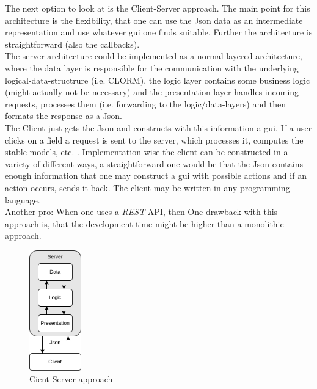 \documentclass[12pt,a4paper]{article}
\newcommand{\<}[1]{\guilsinglleft}
\renewcommand{\>}[1]{\guilsinglright}
\begin{document}
\noindent The next option to look at is the Client-Server approach. The main point for this architecture is the flexibility, that one can use the Json data as an intermediate representation and use whatever gui one finds suitable. Further the architecture is straightforward (also the callbacks).\\
The server architecture could be implemented as a normal layered-architecture, where the data layer is responsible for the communication with the underlying logical-data-structrure (i.e. CLORM), the logic layer contains some business logic (might actually not be necessary) and the presentation layer handles incoming requests, processes them (i.e. forwarding to the logic/data-layers) and then formats the response as a Json.\\[1em]
The Client just gets the Json and constructs with this information a gui. If a user clicks on a field a request is sent to the server, which processes it, computes the stable models, etc. . Implementation wise the client can be constructed in a variety of different ways, a straightforward one would be that the Json contains enough information that one may construct a gui with possible actions and if an action occurs, sends it back. The client may be written in any programming language. \\[1em]
Another pro: When one uses a \textit{REST}-API, then 
One drawback with this approach is, that the development time might be higher than a monolithic approach.

\begin{figure}[ht]
    \begin{center}
    \includegraphics[width=0.2\textwidth]{imgs/client-server.png}
    \caption{Cient-Server approach}
    \label{fig:client-server}
    \end{center}
\end{figure}
\end{document}
